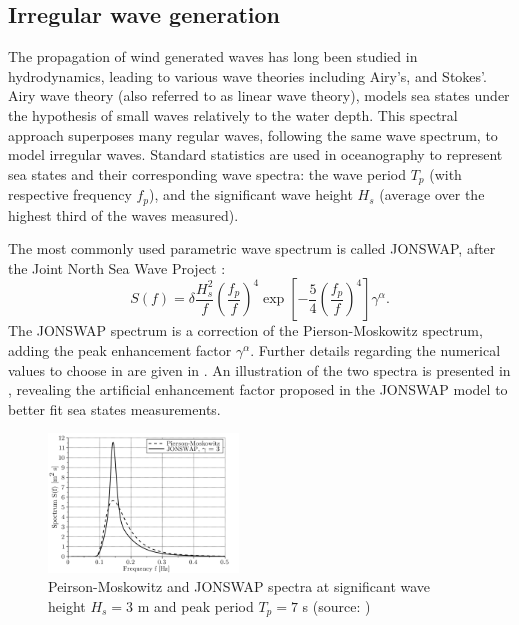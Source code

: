\subsection{Irregular wave generation}

The propagation of wind generated waves has long been studied in hydrodynamics, leading to various wave theories including Airy's, and Stokes'. 
Airy wave theory (also referred to as linear wave theory), models sea states under the hypothesis of small waves relatively to the water depth.  
This spectral approach superposes many regular waves, following the same wave spectrum, to model irregular waves. 
Standard statistics are used in oceanography to represent sea states and their corresponding wave spectra: 
the wave period $T_p$ (with respective frequency $f_p$), and the significant wave height $H_s$ (average over the highest third of the waves measured). 

The most commonly used parametric wave spectrum is called JONSWAP, after the Joint North Sea Wave Project \citep{jonswap_1973}: 
\begin{equation}
    S(f) = \delta \frac{H_s^2}{f} \left(\frac{f_p}{f}\right)^4 \exp\left[-\frac54 \left(\frac{f_p}{f}\right)^4 \right] \gamma^\alpha.
    \label{eq:jonswap}
\end{equation}
The JONSWAP spectrum is a correction of the Pierson-Moskowitz spectrum, adding the peak enhancement factor $\gamma^\alpha$. 
Further details regarding the numerical values to choose in  are given in \citet{burton_2021_wind_handbook}. 
An illustration of the two spectra is presented in , revealing the artificial enhancement factor proposed in the JONSWAP model to better fit sea states measurements. 

\begin{figure}%
    \centering
    \includegraphics[width=0.45\textwidth]{./part1/figures/jonswap.png}
    \caption{Peirson-Moskowitz and JONSWAP spectra at significant wave height $H_s = 3$
    m and peak period $T_p = 7$ s (source: \citet{milano_thesis_2021})}
    \label{fig:jonswap}
\end{figure}

